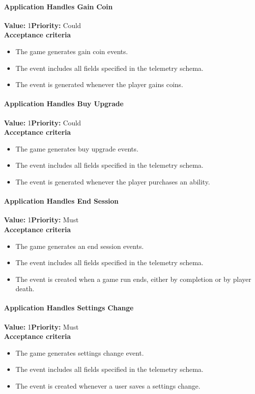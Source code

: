 \paragraph{Application Handles Gain Coin}
\textbf{Value:} 1\quad \textbf{Priority:} Could\\
\textbf{Acceptance criteria}
\begin{itemize}
  \item The game generates gain coin events.
  \item The event includes all fields specified in the telemetry schema.
  \item The event is generated whenever the player gains coins.
\end{itemize}

\paragraph{Application Handles Buy Upgrade}
\textbf{Value:} 1\quad \textbf{Priority:} Could\\
\textbf{Acceptance criteria}
\begin{itemize}
  \item The game generates buy upgrade events.
  \item The event includes all fields specified in the telemetry schema.
  \item The event is generated whenever the player purchases an ability.
\end{itemize}

\paragraph{Application Handles End Session}
\textbf{Value:} 1\quad \textbf{Priority:} Must\\
\textbf{Acceptance criteria}
\begin{itemize}
  \item The game generates an end session events.
  \item The event includes all fields specified in the telemetry schema.
  \item The event is created when a game run ends, either by completion or by player death.
\end{itemize}

\paragraph{Application Handles Settings Change}
\textbf{Value:} 1\quad \textbf{Priority:} Must\\
\textbf{Acceptance criteria}
\begin{itemize}
  \item The game generates settings change event.
  \item The event includes all fields specified in the telemetry schema.
  \item The event is created whenever a user saves a settings change.
\end{itemize}

